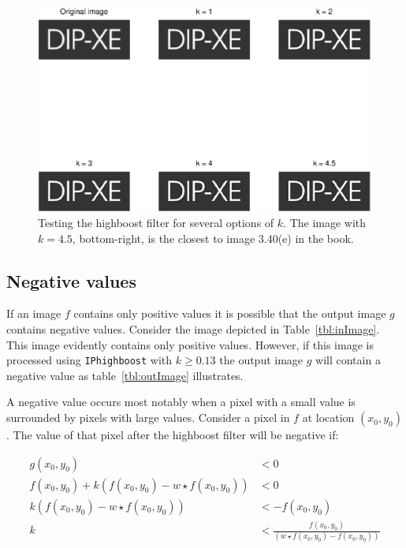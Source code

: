 \begin{figure}[h]
 \centering
 \includegraphics{dipxe.eps}
 \caption{Testing the highboost filter for several options of $k$. The image with $k = 4.5$, bottom-right, is the closest to image 3.40(e) in the book.}
 \label{fig:dipxe}
\end{figure}

\subsection{Negative values}
If an image \(f\) contains only positive values it is possible that the output image \(g\) contains negative values.
Consider the image depicted in Table~\ref{tbl:inImage}.
This image evidently contains only positive values.
However, if this image is processed using \texttt{IPhighboost} with \(k \geq 0.13\) the output image \(g\) will contain a negative value as table~\ref{tbl:outImage} illustrates.

A negative value occurs most notably when a pixel with a small value is surrounded by pixels with large values.
Consider a pixel in \(f\) at location \(( x_0, y_0 )\).
The value of that pixel after the highboost filter will be negative if:

\begin{equation} \label{zero_pixel}
  \begin{split}
    g(x_0, y_0) &< 0 \\
    f(x_0, y_0) +  k(f(x_0, y_0) - w \star f(x_0, y_0)) &< 0 \\
    k(f(x_0, y_0) - w \star f(x_0, y_0)) &< -f(x_0, y_0) \\
    k &< \frac{f(x_0, y_0)}{(w \star f(x_0, y_0) - f(x_0, y_0))}
  \end{split}
\end{equation}

